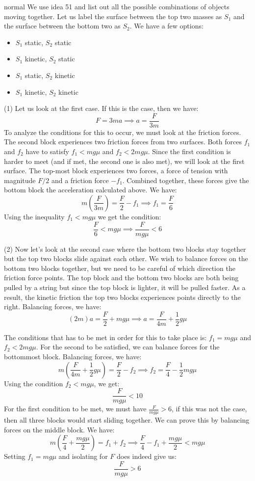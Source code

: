 \begin{solution}{normal}
We use idea 51 and list out all the possible combinations of objects moving together. Let us label the surface between the top two masses as $S_1$ and the surface between the bottom two as $S_2$. We have a few options:
\begin{itemize}
    \item $S_1$ static, $S_2$ static
    \item $S_1$ kinetic, $S_2$ static
    \item $S_1$ static, $S_2$ kinetic
    \item $S_1$ kinetic, $S_2$ kinetic 
\end{itemize}
(1) Let us look at the first case. If this is the case, then we have:
$$F=3ma \implies a=\frac{F}{3m}$$
To analyze the conditions for this to occur, we must look at the friction forces. The second block experiences two friction forces from two surfaces. Both forces $f_1$ and $f_2$ have to satisfy $f_1 < mg\mu$ and $f_2 < 2mg\mu$. Since the first condition is harder to meet (and if met, the second one is also met), we will look at the first surface. The top-most block experiences two forces, a force of tension with magnitude $F/2$ and a friction force $-f_1$. Combined together, these forces give the bottom block the acceleration calculated above. We have:
$$m\left(\frac{F}{3m}\right)=\frac{F}{2}-f_1 \implies f_1 = \frac{F}{6}$$
Using the inequality $f_1 < mg\mu$ we get the condition:
$$\frac{F}{6} < mg\mu \implies \frac{F}{mg\mu} < 6$$
\vspace{3mm}

(2) Now let's look at the second case where the bottom two blocks stay together but the top two blocks slide against each other. We wish to balance forces on the bottom two blocks together, but we need to be careful of which direction the friction force points. The top block and the bottom two blocks are both being pulled by a string but since the top block is lighter, it will be pulled faster. As a result, the kinetic friction the top two blocks experiences points directly to the right. Balancing forces, we have:
$$(2m)a=\frac{F}{2}+mg\mu \implies a = \frac{F}{4m}+\frac{1}{2}g\mu$$
\vspace{3mm}

The conditions that has to be met in order for this to take place is: $f_1 = mg\mu$ and $f_2<2mg\mu$. For the second to be satisfied, we can balance forces for the bottommost block. Balancing forces, we have:
$$m\left(\frac{F}{4m}+\frac{1}{2}g\mu\right)=\frac{F}{2}-f_2 \implies f_2 =\frac{F}{4}-\frac{1}{2}mg\mu$$
Using the condition $f_2 < mg\mu$, we get:
$$\frac{F}{mg\mu} < 10$$
For the first condition to be met, we must have $\frac{F}{mg\mu}>6$, if this was not the case, then all three blocks would start sliding together. We can prove this by balancing forces on the middle block. We have:
$$m\left(\frac{F}{4}+\frac{mg\mu}{2}\right)=f_1+f_2 \implies \frac{F}{4}-f_1+\frac{mg\mu}{2} < mg\mu$$
Setting $f_1=mg\mu$ and isolating for $F$ does indeed give us:
$$\frac{F}{mg\mu}>6$$
\vspace{3mm}


\end{solution}
